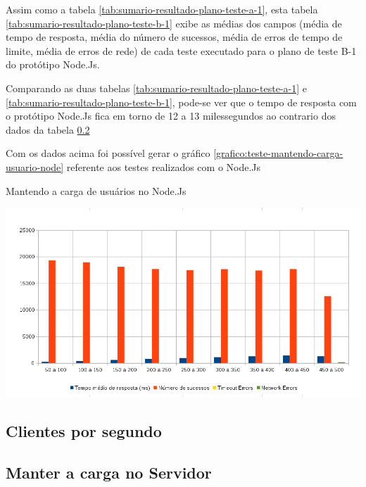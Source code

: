   Assim como a tabela \ref{tab:sumario-resultado-plano-teste-a-1}, esta tabela \ref{tab:sumario-resultado-plano-teste-b-1} exibe as médias 
  dos campos (média de tempo de resposta, média do número de sucessos, média de erros de tempo de limite, média de erros de rede) 
  de cada teste executado para o plano de teste B-1 do protótipo Node.Js.
  
  Comparando as duas tabelas \ref{tab:sumario-resultado-plano-teste-a-1} e \ref{tab:sumario-resultado-plano-teste-b-1}, pode-se ver que 
  o tempo de resposta com o protótipo Node.Js fica em torno de 12 a 13 milessegundos ao contrario dos dados da tabela \ref{}
  
  Com os dados acima foi possível gerar o gráfico \ref{grafico:teste-mantendo-carga-usuario-node} referente aos testes 
  realizados com o Node.Js

  \begin{grafico}[H]
    \setlength{\abovecaptionskip}{5pt}
    \setlength{\belowcaptionskip}{0pt}
    \label{grafico:teste-mantendo-carga-usuario-node}
    \caption[Mantendo a carga de usuários no Node.Js]
	    {Mantendo a carga de usuários no Node.Js}
    \centering
    \includegraphics[width=.80\textwidth]{imagem/graficos/grafico_node_plano_de_teste_3.png}
    \captionsetup[grafico]{justification=centering}
  \end{grafico}
   
\subsection{Clientes por segundo}  


    
\subsection{Manter a carga no Servidor}  

